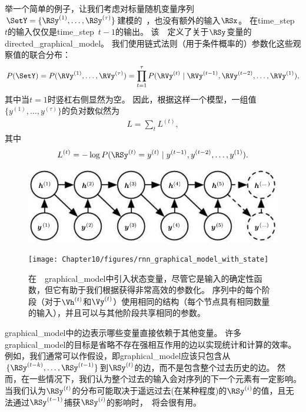 举一个简单的例子，让我们考虑对标量随机变量序列$ \SetY = \{\RSy^{(1)},\dots,\RSy^{(\tau)}\}$建模的~，也没有额外的输入$\RSx$。
在\gls{time_step}~$t$的输入仅仅是\gls{time_step}~$t-1$的输出。
该~~定义了关于$\RSy$变量的\gls{directed_graphical_model}。
我们使用链式法则（用于条件概率的）参数化这些观察值的联合分布：
\begin{align}
 P(\SetY) = P(\RVy^{(1)},\dots,\RVy^{(\tau)}) = \prod_{t=1}^{\tau}P(\RVy^{(t)} \mid \RVy^{(t-1)},\RVy^{(t-2)},
 \dots,\RVy^{(1)}),
\end{align}
其中当$t=1$时竖杠右侧显然为空。
因此，根据这样一个模型，一组值$\{y^{(1)},\dots,y^{(\tau)} \}$的负对数似然为
\begin{align}
 L = \sum_{t} L^{(t)},
\end{align}
其中
\begin{align}
 L^{(t)} = -\log P(\RSy^{(t)} = y^{(t)} \mid y^{(t-1)},y^{(t-2)}, \dots, y^{(1)}).
\end{align}
\begin{figure}[!htb]
\ifOpenSource
\centerline{\includegraphics[scale=0.5]{images/96.png}}
\else
\centerline{\texttt{[image: Chapter10/figures/rnn\_graphical\_model\_with\_state]}}
\fi
\caption{在~~\gls{graphical_model}中引入状态变量，尽管它是输入的确定性函数，但它有助于我们根据获得非常高效的参数化。
序列中的每个阶段（对于$\Vh^{(t)}$和$\Vy^{(t)}$）使用相同的结构（每个节点具有相同数量的输入），并且可以与其他阶段共享相同的参数。
}
\label{fig:chap10_rnn_graphical_model_with_state}
\end{figure}

\gls{graphical_model}中的边表示哪些变量直接依赖于其他变量。
许多\gls{graphical_model}的目标是省略不存在强相互作用的边以实现统计和计算的效率。
例如，我们通常可以作假设，即\gls{graphical_model}应该只包含从$\{ \RSy^{(t-k)}, \dots, \RSy^{(t-1)}\}$到$\RSy^{(t)}$的边，而不是包含整个过去历史的边。
然而，在一些情况下，我们认为整个过去的输入会对序列的下一个元素有一定影响。
当我们认为$\RSy^{(t)}$的分布可能取决于遥远过去(在某种程度)的$\RSy^{(i)}$的值，且无法通过$\RSy^{(t-1)}$捕获$\RSy^{(i)}$的影响时，~将会很有用。

